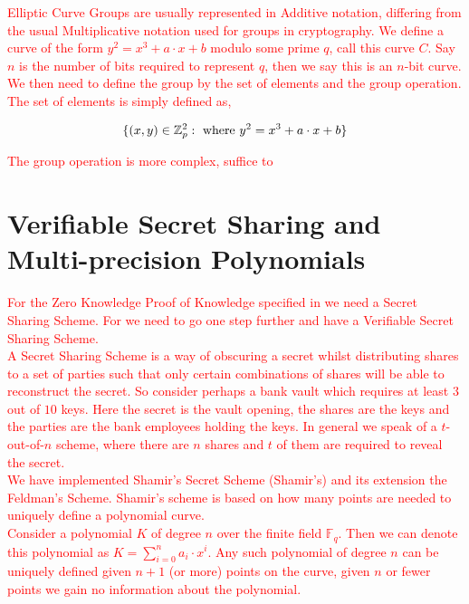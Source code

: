 \documentclass[ %
                    author={Nicholas Tutte},
                supervisor={Prof. Nigel Smart},
                    degree={MEng},
                     title={Secure Two Party Computation},
                  subtitle={A practical comparison of recent protocols},
                      type={Research - GG1K},
                      year={2015} ]{dissertation}
\begin{document}
			\textcolor{red}{Elliptic Curve Groups are usually represented in Additive notation, differing from the usual Multiplicative notation used for groups in cryptography. We define a curve of the form $y^2 = x^3 + a\cdot x + b$ modulo some prime $q$, call this curve $C$. Say $n$ is the number of bits required to represent $q$, then we say this is an $n$-bit curve.}\\
			
			\textcolor{red}{We then need to define the group by the set of elements and the group operation. The set of elements is simply defined as,}

			$$\{(x, y) \in \mathbb{Z}_p^2 : \textnormal{ where } y^2 = x^3 + a\cdot x + b\} $$

			\textcolor{red}{The group operation is more complex, suffice to }

		\section{Verifiable Secret Sharing and Multi-precision Polynomials}

			\textcolor{red}{For the Zero Knowledge Proof of Knowledge specified in \cite{LindellAndPinkas2011} we need a Secret Sharing Scheme. For \cite{Katz_Symm_CnC_2013} we need to go one step further and have a Verifiable Secret Sharing Scheme.}\\

			\textcolor{red}{A Secret Sharing Scheme is a way of obscuring a secret whilst distributing shares to a set of parties such that only certain combinations of shares will be able to reconstruct the secret. So consider perhaps a bank vault which requires at least $3$ out of $10$ keys. Here the secret is the vault opening, the shares are the keys and the parties are the bank employees holding the keys. In general we speak of a $t$-out-of-$n$ scheme, where there are $n$ shares and $t$ of them are required to reveal the secret.}\\

			\textcolor{red}{We have implemented Shamir's Secret Scheme (Shamir's) and its extension the Feldman's Scheme. Shamir's scheme is based on how many points are needed to uniquely define a polynomial curve. }\\

			\textcolor{red}{Consider a polynomial $K$ of degree $n$ over the finite field $\mathbb{F}_q$. Then we can denote this polynomial as $K = \sum_{i=0}^{n} a_i \cdot x ^ i$. Any such polynomial of degree $n$ can be uniquely defined given $n+1$ (or more) points on the curve, given $n$ or fewer points we gain no information about the polynomial.}
\end{document}
